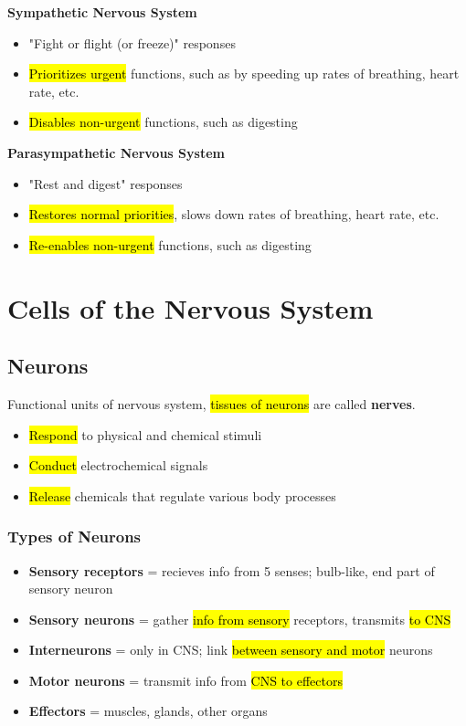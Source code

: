 \documentclass[a4paper,12pt]{article}
\begin{document}
\textbf{Sympathetic Nervous System}
\begin{itemize}
    \item{"Fight or flight (or freeze)" responses}
    \item{\hl{Prioritizes urgent} functions, such as by speeding up rates of breathing, heart rate, etc.}
    \item{\hl{Disables non-urgent} functions, such as digesting}
\end{itemize}

\textbf{Parasympathetic Nervous System}
\begin{itemize}
    \item{"Rest and digest" responses}
    \item{\hl{Restores normal priorities}, slows down rates of breathing, heart rate, etc.}
    \item{\hl{Re-enables non-urgent} functions, such as digesting}
\end{itemize}

\pagebreak

\section{Cells of the Nervous System}
\subsection{Neurons}
Functional units of nervous system, \hl{tissues of neurons} are called \textbf{nerves}.
\begin{itemize}
    \item{\hl{Respond} to physical and chemical stimuli}
    \item{\hl{Conduct} electrochemical signals}
    \item{\hl{Release} chemicals that regulate various body processes}
\end{itemize}

\subsubsection{Types of Neurons}
\begin{itemize}
    \item{\textbf{Sensory receptors} = recieves info from 5 senses; bulb-like, end part of sensory neuron}
    \item{\textbf{Sensory neurons} = gather \hl{info from sensory} receptors, transmits \hl{to CNS}}
    \item{\textbf{Interneurons} = only in CNS; link \hl{between sensory and motor} neurons}
    \item{\textbf{Motor neurons} = transmit info from \hl{CNS to effectors}}
    \item{\textbf{Effectors} = muscles, glands, other organs}
\end{itemize}
\end{document}
